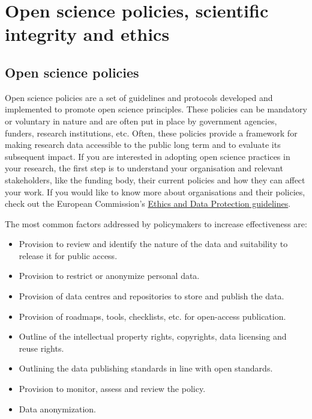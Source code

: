 \documentclass[
]{book}
\begin{document}
\hypertarget{open-science-policies-scientific-integrity-and-ethics}{%
\chapter{Open science policies, scientific integrity and ethics}\label{open-science-policies-scientific-integrity-and-ethics}}

\hypertarget{open-science-policies}{%
\section{Open science policies}\label{open-science-policies}}

Open science policies are a set of guidelines and protocols developed and implemented to promote open science principles. These policies can be mandatory or voluntary in nature and are often put in place by government agencies, funders, research institutions, etc. Often, these policies provide a framework for making research data accessible to the public long term and to evaluate its subsequent impact. If you are interested in adopting open science practices in your research, the first step is to understand your organisation and relevant stakeholders, like the funding body, their current policies and how they can affect your work. If you would like to know more about organisations and their policies, check out the European Commission's \href{https://ec.europa.eu/research/participants/data/ref/h2020/grants_manual/hi/ethics/h2020_hi_ethics-data-protection_en.pdf}{Ethics and Data Protection guidelines}.

The most common factors addressed by policymakers to increase effectiveness are:

\begin{itemize}
\item
  Provision to review and identify the nature of the data and suitability to release it for public access.
\item
  Provision to restrict or anonymize personal data.
\item
  Provision of data centres and repositories to store and publish the data.
\item
  Provision of roadmaps, tools, checklists, etc. for open-access publication.
\item
  Outline of the intellectual property rights, copyrights, data licensing and reuse rights.
\item
  Outlining the data publishing standards in line with open standards.
\item
  Provision to monitor, assess and review the policy.
\item
  Data anonymization.
\end{itemize}
\end{document}
